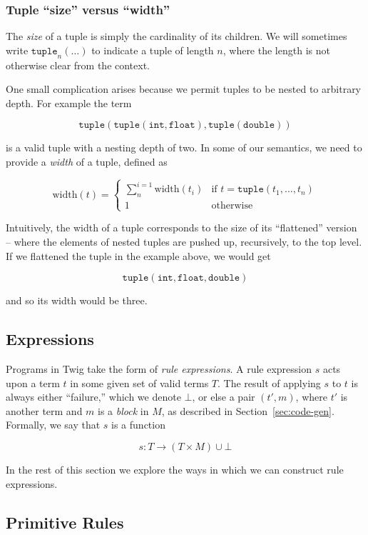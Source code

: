 \subsubsection{Tuple ``size'' versus ``width''}

The \emph{size} of a tuple is simply the cardinality of its children. We will sometimes write $\mathtt{tuple}_n(\ldots)$ to indicate a tuple of length $n$, where the length is not otherwise clear from the context. 

One small complication arises because we permit tuples to be nested to arbitrary depth. For example the term

\[
\mathtt{tuple(tuple(int,float),tuple(double))} 
\]

is a valid tuple with a nesting depth of two. In some of our semantics, we need to provide a \emph{width} of a tuple, defined as 

\[
\mbox{width}(t) = \left\{
    \begin{array}{cl}
      \sum^{i=1}_{n} \mbox{width}(t_i) & \mbox{if } t = \mathtt{tuple}(t_1,\ldots,t_n)\\
      1 & \mbox{otherwise}
    \end{array}
  \right.
\]

Intuitively, the width of a tuple corresponds to the size of its ``flattened'' version -- where the elements of nested tuples are pushed up, recursively, to the top level. If we flattened the tuple in the example above, we would get

\[
\mathtt{tuple(int,float,double)}
\]

and so its width would be three.

\subsection{Expressions}

Programs in Twig take the form of \emph{rule expressions}. A rule expression $s$ acts upon a term $t$ in some given set of valid terms $T$. The result of applying $s$ to $t$ is always either ``failure,'' which we denote $\bot$, or else a pair $(t',m)$, where $t'$ is another term and $m$ is a \emph{block} in $M$, as described in Section~\ref{sec:code-gen}. Formally, we say that $s$ is a function

\[
s : T \to (T \times M) \cup \bot
\]

In the rest of this section we explore the ways in which we can construct rule expressions.

\subsection{Primitive Rules}

